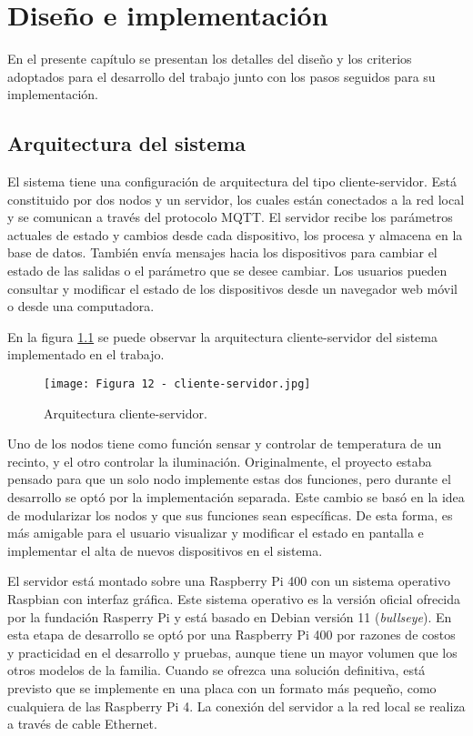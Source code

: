 \chapter{Diseño e implementación}

\label{Chapter3}

En el presente capítulo se presentan los detalles del diseño y los criterios adoptados para el desarrollo del trabajo junto con los pasos seguidos para su implementación.

\section{Arquitectura del sistema}

El sistema tiene una configuración de arquitectura del tipo cliente-servidor. Está constituido por dos nodos y un servidor, los cuales están conectados a la red local y se comunican a través del protocolo MQTT. El servidor recibe los parámetros actuales de estado y cambios desde cada dispositivo, los procesa y almacena en la base de datos. También envía mensajes hacia los dispositivos para cambiar el estado de las salidas o el parámetro que se desee cambiar. Los usuarios pueden consultar y modificar el estado de los dispositivos desde un navegador web móvil o desde una computadora.

En la figura \ref{fig:12} se puede observar la arquitectura cliente-servidor del sistema implementado en el trabajo.

\begin{figure}[h]
\centering
\texttt{[image: Figura 12 - cliente-servidor.jpg]}
\caption[Arquitectura cliente-servidor]{Arquitectura cliente-servidor. \footnotemark}
\label{fig:12}
\end{figure}

Uno de los nodos tiene como función sensar y controlar de temperatura de un recinto, y el otro controlar la iluminación. Originalmente, el proyecto estaba pensado para que un solo nodo implemente estas dos funciones, pero durante el desarrollo se optó por la implementación separada. Este cambio se basó en la idea de modularizar los nodos y que sus funciones sean específicas. De esta forma, es más amigable para el usuario visualizar y modificar el estado en pantalla e implementar el alta de nuevos dispositivos en el sistema.

El servidor está montado sobre una Raspberry Pi 400 con un sistema operativo Raspbian con interfaz gráfica. Este sistema operativo es la versión oficial ofrecida por la fundación Rasperry Pi y está basado en Debian versión 11 (\textit{bullseye}). En esta etapa de desarrollo se optó por una Raspberry Pi 400 por razones de costos y practicidad en el desarrollo y  pruebas, aunque tiene un mayor volumen que los otros modelos de la familia. Cuando se ofrezca una solución definitiva, está previsto que se implemente en una placa con un formato más pequeño, como cualquiera de las Raspberry Pi 4. La conexión del servidor a la red local se realiza a través de cable Ethernet.

